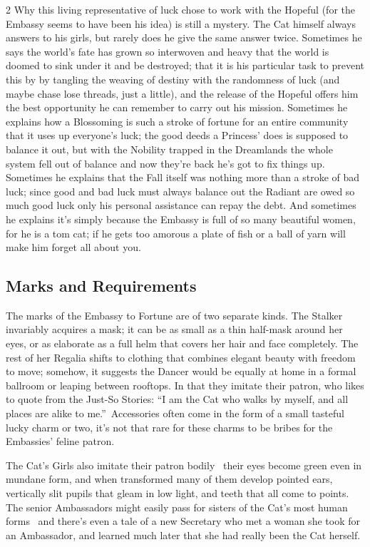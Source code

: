 \begin{multicols}{2}
Why this living representative of luck chose to work with the Hopeful (for the Embassy seems to have been his idea) is still a mystery. The Cat himself always answers to his girls, but rarely does he give the same answer twice. Sometimes he says the world's fate has grown so interwoven and heavy that the world is doomed to sink under it and be destroyed; that it is his particular task to prevent this by by tangling the weaving of destiny with the randomness of luck (and maybe chase lose threads, just a little), and the release of the Hopeful offers him the best opportunity he can remember to carry out his mission. Sometimes he explains how a Blossoming is such a stroke of fortune for an entire community that it uses up everyone's luck; the good deeds a Princess' does is supposed to balance it out, but with the Nobility trapped in the Dreamlands the whole system fell out of balance and now they're back he's got to fix things up. Sometimes he explains that the Fall itself was nothing more than a stroke of bad 
luck; since good and bad luck must always balance out the Radiant are owed so much good luck only his personal assistance can repay the debt. And sometimes he explains it's simply because the Embassy is full of so many beautiful women, for he is a tom cat; if he gets too amorous a plate of fish or a ball of yarn will make him forget all about you. 

\subsection*{Marks and Requirements}
The marks of the Embassy to Fortune are of two separate kinds. The Stalker invariably acquires a mask; it can be as small as a thin half-mask around her eyes, or as elaborate as a full helm that covers her hair and face completely. The rest of her Regalia shifts to clothing that combines elegant beauty with freedom to move; somehow, it suggests the Dancer would be equally at home in a formal ballroom or leaping between rooftops. In that they imitate their patron, who likes to quote from the Just-So Stories: \textquotedblleft I am the Cat who walks by myself, and all places are alike to me.\textquotedblright\, Accessories often come in the form of a small tasteful lucky charm or two, it's not that rare for these charms to be bribes for the Embassies' feline patron.

The Cat's Girls also imitate their patron bodily \textendash\, their eyes become green even in mundane form, and when transformed many of them develop pointed ears, vertically slit pupils that gleam in low light, and teeth that all come to points. The senior Ambassadors might easily pass for sisters of the Cat's most human forms \textendash\, and there's even a tale of a new Secretary who met a woman she took for an Ambassador, and learned much later that she had really been the Cat herself.


\end{multicols}
